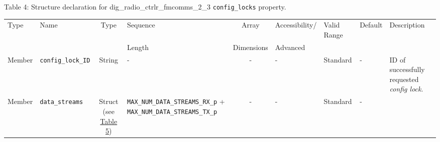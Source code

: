 \documentclass{article}
\def\comp{dig\_radio\_ctrlr\_fmcomms\_2\_3}
\begin{document}
\begin{landscape}
	\noindent Table \hypertarget{tab4}{4}: Structure declaration for \comp{} \verb+config_locks+ property.
	\begin{scriptsize}
		\noindent\begin{longtable}{|p{1.8cm}|p{3.6cm}|c|p{4cm}|c|p{2cm}|p{1.7cm}|p{0.8cm}|p{3.10cm}|}
			\hline
			\rowcolor{blue}
			Type         & Name                                & Type & Sequence & Array      & Accessibility/ & Valid Range  & Default & Description                                                                                                                                                                                                                       \\
			\rowcolor{blue}
			             &                                     &      & Length   & Dimensions & Advanced       &              &         &                                                                                                                                                                                                                             \\
			\hline
			Member       & \verb+config_lock_ID+               & String& -       & -          & -              & Standard     & -       & ID of successfully requested \textit{config lock}. \\
			\hline
			Member       & \verb+data_streams+                 & Struct (see \hyperlink{tab5}{Table 5}) & \verb+MAX_NUM_DATA_STREAMS_RX_p+ + \verb+MAX_NUM_DATA_STREAMS_TX_p+ & - & - & Standard & - & \\
			\hline
		\end{longtable}
	\end{scriptsize}


\end{landscape}
\end{document}
